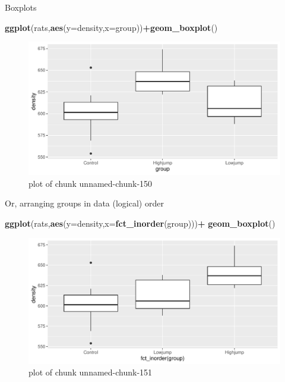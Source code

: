 \documentclass[
  ignorenonframetext,
]{beamer}
\newenvironment{Shaded}{\begin{snugshade}}{\end{snugshade}}
\newcommand{\DataTypeTok}[1]{\textcolor[rgb]{0.13,0.29,0.53}{#1}}
\newcommand{\KeywordTok}[1]{\textcolor[rgb]{0.13,0.29,0.53}{\textbf{#1}}}
\newcommand{\NormalTok}[1]{#1}
\newcommand{\OperatorTok}[1]{\textcolor[rgb]{0.81,0.36,0.00}{\textbf{#1}}}
\begin{document}
\begin{frame}[fragile]{Boxplots}
\protect\hypertarget{boxplots-1}{}

\begin{Shaded}
\begin{Highlighting}[]
\KeywordTok{ggplot}\NormalTok{(rats,}\KeywordTok{aes}\NormalTok{(}\DataTypeTok{y=}\NormalTok{density,}\DataTypeTok{x=}\NormalTok{group))}\OperatorTok{+}\KeywordTok{geom_boxplot}\NormalTok{()}
\end{Highlighting}
\end{Shaded}

\begin{figure}
\centering
\includegraphics{figure/unnamed-chunk-150-1.pdf}
\caption{plot of chunk unnamed-chunk-150}
\end{figure}

\end{frame}

\begin{frame}[fragile]{Or, arranging groups in data (logical) order}
\protect\hypertarget{or-arranging-groups-in-data-logical-order}{}

\begin{Shaded}
\begin{Highlighting}[]
\KeywordTok{ggplot}\NormalTok{(rats,}\KeywordTok{aes}\NormalTok{(}\DataTypeTok{y=}\NormalTok{density,}\DataTypeTok{x=}\KeywordTok{fct_inorder}\NormalTok{(group)))}\OperatorTok{+}
\KeywordTok{geom_boxplot}\NormalTok{()}
\end{Highlighting}
\end{Shaded}

\begin{figure}
\centering
\includegraphics{figure/unnamed-chunk-151-1.pdf}
\caption{plot of chunk unnamed-chunk-151}
\end{figure}

\end{frame}
\end{document}
